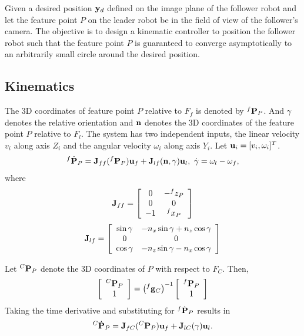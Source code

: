 \documentclass[12pt,a4paper]{article}
\begin{document}
\indent Given a desired position ${\bf y}_d$ defined on the image plane of the follower robot and let the feature point $P$ on the leader robot be in the field of view of the follower's camera. The objective is to design a kinematic controller to position the follower robot such that the feature point $P$ is guaranteed to converge asymptotically to an arbitrarily small circle around the desired position.

\subsection{Kinematics}

\indent The 3D coordinates of feature point $P$ relative to $F_f$ is denoted by ${}^f{\bf P}_P$. And $\gamma$ denotes the relative orientation and $\bf n$ denotes the 3D coordinates of the feature point $P$ relative to $F_l$. The system has two independent inputs, the linear velocity $v_i$ along axis $Z_i$ and the angular velocity $\omega_i$ along axis $Y_i$. Let ${\bf u}_i=[v_i,\omega_i]^T$.
\begin{equation}
{}^f\dot{\bf P}_P={\bf J}_{ff}({}^f{\bf P}_P){\bf u}_f+{\bf J}_{lf}({\bf n},\gamma){\bf u}_l,\
\dot \gamma = \omega_l-\omega_f,
\end{equation}
where
\begin{equation}
{\bf J}_{ff}=
\left[
\begin{array}{cc}
    0  &-{}^fz_P \\
    0  &0 \\
    -1 &{}^fx_P \\
\end{array}
\right]
\end{equation}
\begin{equation}
{\bf J}_{lf}=
\left[
\begin{array}{cc}
    \sin\gamma  &-n_x\sin\gamma+n_z\cos\gamma \\
    0           &0 \\
    \cos\gamma  &-n_z\sin\gamma-n_x\cos\gamma \\
\end{array}
\right]
\end{equation}

\indent Let ${}^C{\bf P}_P$ denote the 3D coordinates of $P$ with respect to $F_C$. Then,
\begin{equation}
\left[
    \begin{array}{c}
    {}^C{\bf P}_P \\
    1
    \end{array}
\right]
=\left({}^f{\bf g}_C\right)^{-1}
\left[
    \begin{array}{c}
    {}^f{\bf P}_P \\
    1
    \end{array}
\right]
\end{equation}
Taking the time derivative and substituting for ${}^f\dot{\bf P}_P$ results in
\begin{equation}
{}^C\dot{\bf P}_P={\bf J}_{fC}({}^C{\bf P}_P){\bf u}_f+{\bf J}_{lC}(\gamma){\bf u}_l.
\label{cpp}
\end{equation}
\end{document}
